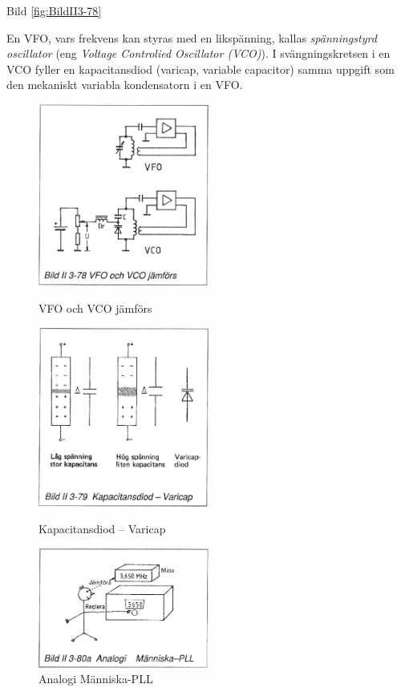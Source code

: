 Bild \ref{fig:BildII3-78}

En VFO, vars frekvens kan styras med en likspänning, kallas
\emph{spänningstyrd oscillator} (eng \emph{Voltage Controlied Oscillator
(VCO)}). I svängningskretsen i en VCO fyller en kapacitansdiod (varicap,
variable capacitor) samma uppgift som den mekaniskt variabla kondensatorn i en
VFO.

\begin{figure}
  \includegraphics[width=0.5\textwidth]{images/bild_2_3-78}
  \caption{VFO och VCO jämförs}
  \label{fig:BildII3-78}

  \includegraphics[width=0.5\textwidth]{images/bild_2_3-79}
  \caption{Kapacitansdiod -- Varicap}
  \label{fig:BildII3-79}

  \includegraphics[width=0.5\textwidth]{images/bild_2_3-80a}
  \caption{Analogi Människa-PLL}
  \label{fig:BildII3-80a}
\end{figure}

